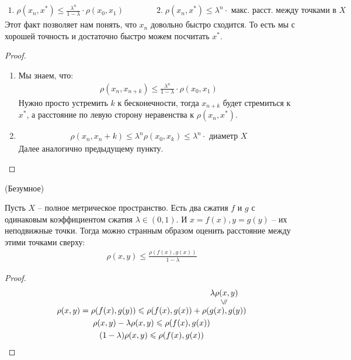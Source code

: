 \notice
\begin{gather*}
    1. \; \rho(x_n, x^*) \leqslant \frac{\lambda^n}{1 - \lambda} \cdot \rho(x_0, x_1) \qquad \qquad 
    2. \; \rho(x_n, x^*) \leqslant \lambda^n \cdot \text{ макс. расст. между точками в } X
\end{gather*} 
Этот факт позволяет нам понять, что $x_n$ довольно быстро сходится. То есть мы с хорошей точность и достаточно быстро можем посчитать $x^*$. 
\begin{proof} \quad 

    \begin{enumerate}
        \item Мы знаем, что:
        \begin{gather*}
            \rho(x_n, x_{n+k}) \leqslant \frac{\lambda^n}{1 - \lambda} \cdot \rho(x_0, x_1)
        \end{gather*}
        Нужно просто устремить $k$ к бесконечности, тогда $x_{n+k}$ будет стремиться к $x^*$, а расстояние по левую сторону неравенства к $\rho(x_n, x^*)$.
        \item \begin{gather*}
            \rho(x_n, x_n+k) \leqslant \lambda^n \rho(x_0, x_k) \leqslant \lambda^n \cdot \text{ диаметр } X
        \end{gather*}
        Далее аналогично предыдущему пункту.
    \end{enumerate}
\end{proof}
\follow \; (Безумное)

Пусть $X$ -- полное метрическое пространство. Есть два сжатия $f$ и $g$ с одинаковым коэффициентом сжатия $\lambda \in (0, 1)$.
И $x = f(x), y = g(y)$ -- их неподвижные точки. Тогда можно странным образом оценить расстояние между этими точками сверху: 
\begin{gather*}
    \rho(x, y) \leqslant \frac{\rho(f(x), g(x))}{1 - \lambda}
\end{gather*}
\begin{proof}
    \begin{gather*}
        \rho(x, y) = \rho(f(x), g(y)) \leqslant \rho(f(x), g(x)) + \lessabove{\rho(g(x), g(y))}{\lambda \rho(x, y)} \\
        \rho(x, y) - \lambda \rho(x, y) \leqslant \rho(f(x), g(x)) \\
        (1 - \lambda) \rho(x, y) \leqslant \rho(f(x), g(x))
    \end{gather*}
\end{proof}
